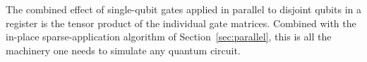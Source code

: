 The combined effect of single-qubit gates applied in parallel to disjoint qubits in a register is the tensor product of the individual gate matrices. Combined with the in-place sparse-application algorithm of Section~\ref{sec:parallel}, this is all the machinery one needs to simulate any quantum circuit.
